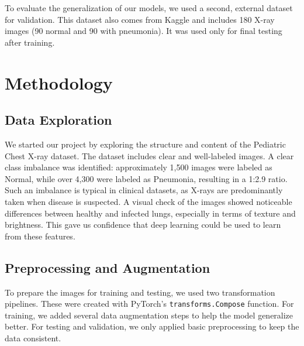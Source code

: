 \documentclass[a4paper,11pt]{article}
\begin{document}
\vspace{0.2cm}To evaluate the generalization of our models, we used a second, external dataset for validation. This dataset also comes from Kaggle and includes 180 X-ray images (90 normal and 90 with pneumonia). It was used only for final testing after training.

\section{Methodology}

\subsection{Data Exploration}
We started our project by exploring the structure and content of the Pediatric Chest X-ray dataset. The dataset includes clear and well-labeled images. A clear class imbalance was identified: approximately 1,500 images were labeled as Normal, while over 4,300
were labeled as Pneumonia, resulting in a 1:2.9 ratio. Such an imbalance is typical in clinical datasets, as X-rays are predominantly taken when disease is suspected. A visual check of the images showed noticeable differences between healthy and infected lungs, especially in terms of texture and brightness. This gave us confidence that deep learning could be used to learn from these features.

\subsection{Preprocessing and Augmentation}
To prepare the images for training and testing, we used two transformation pipelines. These were created with PyTorch’s \texttt{transforms.Compose} function. For training, we added several data augmentation steps to help the model generalize better. For testing and validation, we only applied basic preprocessing to keep the data consistent.
\end{document}
